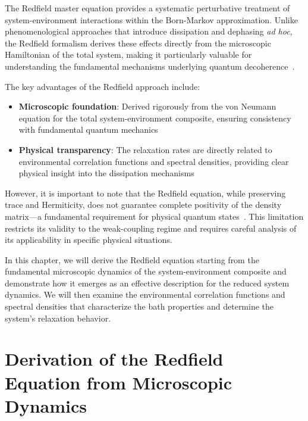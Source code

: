 The Redfield master equation provides a systematic perturbative treatment of system-environment interactions within the Born-Markov approximation. Unlike phenomenological approaches that introduce dissipation and dephasing \emph{ad hoc}, the Redfield formalism derives these effects directly from the microscopic Hamiltonian of the total system, making it particularly valuable for understanding the fundamental mechanisms underlying quantum decoherence~\cite{BreuerPetruccione2009TheoryOpenQuantum, Weiss2012QuantumDissipativeSystems}.

The key advantages of the Redfield approach include:
\begin{itemize}
    \item \textbf{Microscopic foundation}: Derived rigorously from the von Neumann equation for the total system-environment composite, ensuring consistency with fundamental quantum mechanics~\cite{BreuerPetruccione2009TheoryOpenQuantum}
    \item \textbf{Physical transparency}: The relaxation rates are directly related to environmental correlation functions and spectral densities, providing clear physical insight into the dissipation mechanisms~\cite{Redfield1965TheoryRelaxationProcesses}
\end{itemize}

However, it is important to note that the Redfield equation, while preserving trace and Hermiticity, does not guarantee complete positivity of the density matrix—a fundamental requirement for physical quantum states~\cite{RivasEtAl2010MarkovianMasterEquations}. This limitation restricts its validity to the weak-coupling regime and requires careful analysis of its applicability in specific physical situations.

In this chapter, we will derive the Redfield equation starting from the fundamental microscopic dynamics of the system-environment composite and demonstrate how it emerges as an effective description for the reduced system dynamics. We will then examine the environmental correlation functions and spectral densities that characterize the bath properties and determine the system's relaxation behavior.


\section{Derivation of the Redfield Equation from Microscopic Dynamics}
\label{sec:Derivation_redfield_eq_from_microscopic_dynamics}

